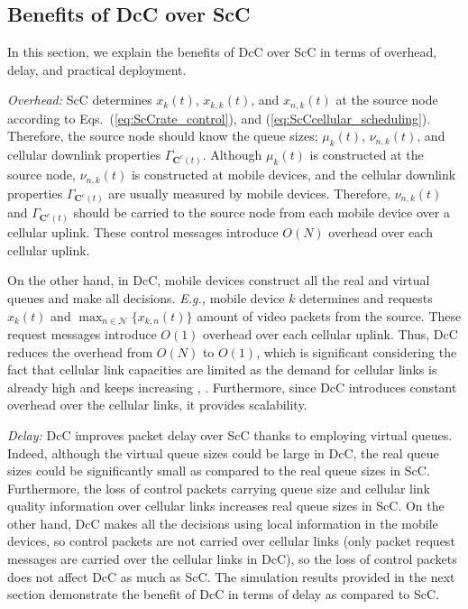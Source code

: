\documentclass[conference]{IEEEtran}
\newcommand{\Eg}{{\em E.g., }}
\newcommand{\Nset}{\mathcal{N}}
\begin{document}
\subsection{Benefits of DcC over ScC}
In this section, we explain the benefits of DcC over ScC in terms of overhead, delay, and practical deployment.

{\em Overhead:} ScC determines ${x}_k(t)$, ${x}_{k,k}(t)$, and ${x}_{n,k}(t)$ at the source node according to Eqs.~(\ref{eq:ScCrate_control}), and (\ref{eq:ScCcellular_scheduling}). Therefore, the source node should know the queue sizes; ${\mu}_{k}(t)$, ${\nu}_{n,k}(t)$, and cellular downlink properties $\Gamma_{\boldsymbol C^c(t)}$. Although ${\mu}_{k}(t)$ is constructed at the source node, ${\nu}_{n,k}(t)$ is constructed at mobile devices, and the cellular downlink properties $\Gamma_{\boldsymbol C^c(t)}$ are usually measured by mobile devices. Therefore, ${\nu}_{n,k}(t)$ and $\Gamma_{\boldsymbol C^c(t)}$ should be carried to the source node from each mobile device over a cellular uplink. These control messages introduce $O(N)$ overhead over each cellular uplink.

On the other hand, in DcC, mobile devices construct all the real and virtual queues and make all decisions. \Eg mobile device $k$ determines and requests $x_{k}(t)$ and $\max_{n \in \Nset}\{x_{k,n}(t)\}$ amount of video packets from the source. These request messages introduce $O(1)$ overhead over each cellular uplink. Thus, DcC reduces the overhead from $O(N)$ to $O(1)$, which is significant considering the fact that cellular link capacities are limited as the demand for cellular links is already high and keeps increasing \cite{cisco_index}, \cite{ericsson_report}. Furthermore, since DcC introduces constant overhead over the cellular links, it provides scalability.

{\em Delay:} DcC improves packet delay over ScC thanks to employing virtual queues. Indeed, although the virtual queue sizes could be large in DcC, the real queue sizes could be significantly small as compared to the real queue sizes in ScC. Furthermore, the loss of control packets carrying queue size and cellular link quality information over cellular links increases real queue sizes in ScC. On the other hand, DcC makes all the decisions using local information in the mobile devices, so control packets are not carried over cellular links (only packet request messages are carried over the cellular links in DcC), so the loss of control packets does not affect DcC as much as ScC. The simulation results provided in the next section demonstrate the benefit of DcC in terms of delay as compared to ScC.
\end{document}
